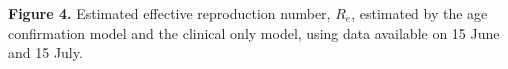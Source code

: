 \textbf{Figure 4.} Estimated effective reproduction number, $R_e$, estimated by the age confirmation model and the clinical only model, using data available on 15 June and 15 July.